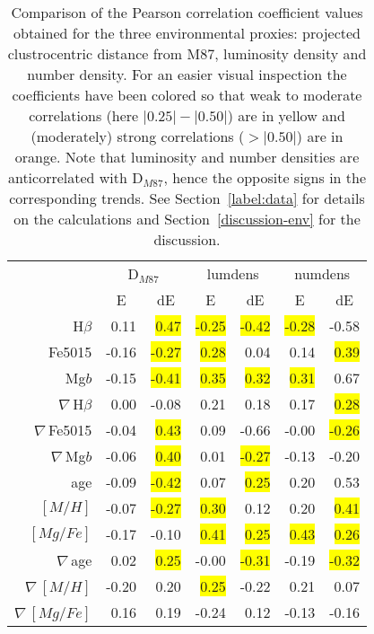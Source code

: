 \documentclass[useAMS,usenatbib]{mn2e}
\begin{document}
\begin{table}
\caption{Comparison of the Pearson correlation coefficient values obtained for the three environmental proxies: projected clustrocentric distance from M87, luminosity density and number density. For an easier visual inspection the coefficients have been colored so that weak to moderate correlations (here $|0.25|-|0.50|$) are in yellow and (moderately) strong correlations ($>|0.50|$) are in orange. Note that luminosity and number densities are anticorrelated with D$_{M87}$, hence the opposite signs in the corresponding trends. See Section~\protect\ref{label:data} for details on the calculations and Section~\protect\ref{discussion-env} for the discussion.}
\centering

\begin{tabular}{|r|r|r|r|r|r|r|}
\hline
           &\multicolumn{2}{c}{D$_{M87}$}&\multicolumn{2}{c}{lumdens}&\multicolumn{2}{c}{numdens}\\
           &\multicolumn{1}{c}{E}         &\multicolumn{1}{c}{dE}	&\multicolumn{1}{c}{E} 		 &\multicolumn{1}{c}{dE}	&\multicolumn{1}{c}{E}			&\multicolumn{1}{c}{dE}\\
\hline           
H$\beta$ & 0.11 & \colorbox{yellow}{0.47} & \colorbox{yellow}{-0.25} & \colorbox{yellow}{-0.42} & \colorbox{yellow}{-0.28} & \colorbox{Dandelion}{-0.58} \\
Fe5015 & -0.16 & \colorbox{yellow}{-0.27} & \colorbox{yellow}{0.28} & 0.04 & 0.14 & \colorbox{yellow}{0.39} \\
\medskip
Mg$b$ & -0.15 & \colorbox{yellow}{-0.41} & \colorbox{yellow}{0.35} & \colorbox{yellow}{0.32} & \colorbox{yellow}{0.31} & \colorbox{Dandelion}{0.67} \\
$\nabla$\,H$\beta$ & 0.00 & -0.08 & 0.21 & 0.18 & 0.17 & \colorbox{yellow}{0.28} \\
$\nabla$\,Fe5015 & -0.04 & \colorbox{yellow}{0.43} & 0.09 & \colorbox{Dandelion}{-0.66} & -0.00 & \colorbox{yellow}{-0.26} \\
\medskip
$\nabla$\,Mg$b$ & -0.06 & \colorbox{yellow}{0.40} & 0.01 & \colorbox{yellow}{-0.27} & -0.13 & -0.20 \\
age & -0.09 & \colorbox{yellow}{-0.42} & 0.07 & \colorbox{yellow}{0.25} & 0.20 & \colorbox{Dandelion}{0.53} \\
$[M/H]$ & -0.07 & \colorbox{yellow}{-0.27} & \colorbox{yellow}{0.30} & 0.12 & 0.20 & \colorbox{yellow}{0.41} \\
\medskip
$[Mg/Fe]$ & -0.17 & -0.10 & \colorbox{yellow}{0.41} & \colorbox{yellow}{0.25} & \colorbox{yellow}{0.43} & \colorbox{yellow}{0.26} \\
$\nabla$\,age & 0.02 & \colorbox{yellow}{0.25} & -0.00 & \colorbox{yellow}{-0.31} & -0.19 & \colorbox{yellow}{-0.32} \\
$\nabla$\,$[M/H]$ & -0.20 & 0.20 & \colorbox{yellow}{0.25} & -0.22 & 0.21 & 0.07 \\
$\nabla$\,$[Mg/Fe]$ & 0.16 & 0.19 & -0.24 & 0.12 & -0.13 & -0.16 \\

\hline
\end{tabular}

\label{proxies-compared}
\end{table}
\end{document}
